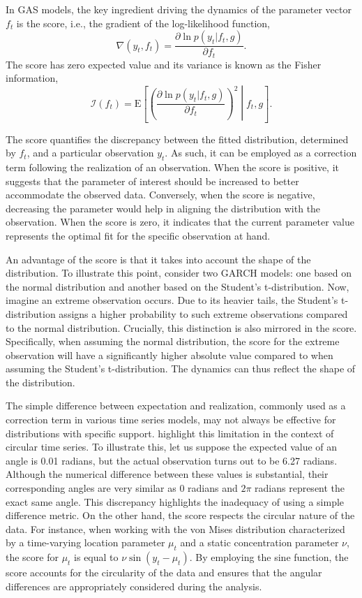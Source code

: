 In GAS models, the key ingredient driving the dynamics of the parameter vector \(f_t\) is the score, i.e., the gradient of the log-likelihood function,
\begin{equation}
\nabla(y_t, f_t) = \frac{\partial \ln p(y_t | f_t, g)}{\partial f_t}.
\label{eq:score}
\end{equation}
The score has zero expected value and its variance is known as the Fisher information,
\begin{equation}
\mathcal{I}(f_t) = \mathrm{E} \left[ \left( \frac{\partial \ln p(y_t | f_t, g)}{\partial f_t} \right)^2 \middle| f_t, g \right].
\label{eq:fisher}
\end{equation}

The score quantifies the discrepancy between the fitted distribution, determined by \(f_t\), and a particular observation \(y_t\). As such, it can be employed as a correction term following the realization of an observation. When the score is positive, it suggests that the parameter of interest should be increased to better accommodate the observed data. Conversely, when the score is negative, decreasing the parameter would help in aligning the distribution with the observation. When the score is zero, it indicates that the current parameter value represents the optimal fit for the specific observation at hand.

An advantage of the score is that it takes into account the shape of the distribution. To illustrate this point, \citet{Creal2013} consider two GARCH models: one based on the normal distribution and another based on the Student's t-distribution. Now, imagine an extreme observation occurs. Due to its heavier tails, the Student's t-distribution assigns a higher probability to such extreme observations compared to the normal distribution. Crucially, this distinction is also mirrored in the score. Specifically, when assuming the normal distribution, the score for the extreme observation will have a significantly higher absolute value compared to when assuming the Student's t-distribution. The dynamics can thus reflect the shape of the distribution.

The simple difference between expectation and realization, commonly used as a correction term in various time series models, may not always be effective for distributions with specific support. \citet{Harvey2024} highlight this limitation in the context of circular time series. To illustrate this, let us suppose the expected value of an angle is 0.01 radians, but the actual observation turns out to be 6.27 radians. Although the numerical difference between these values is substantial, their corresponding angles are very similar as 0 radians and \(2 \pi\) radians represent the exact same angle. This discrepancy highlights the inadequacy of using a simple difference metric. On the other hand, the score respects the circular nature of the data. For instance, when working with the von Mises distribution characterized by a time-varying location parameter \(\mu_t\) and a static concentration parameter \(\nu\), the score for \(\mu_t\) is equal to \(\nu\sin(y_t - \mu_t)\). By employing the sine function, the score accounts for the circularity of the data and ensures that the angular differences are appropriately considered during the analysis.

